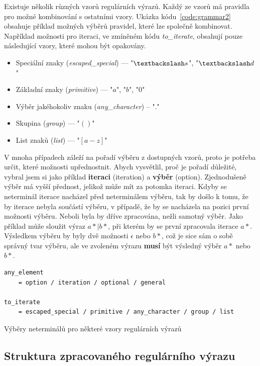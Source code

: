 Existuje několik různých vzorů regulárních výrazů.
Každý ze vzorů má pravidla pro možné kombinování s ostatními vzory.
Ukázka kódu~\ref{code:grammar2} obsahuje příklad možných výběrů pravidel, které lze společně kombinovat.
Například možnosti pro iteraci, ve zmíněném kódu \textit{to\_iterate}, obsahují pouze následující vzory, které mohou být opakovány.

\begin{itemize}
	\item Speciální znaky (\textit{escaped\_special}) --- "$\textbackslash s$", "$\textbackslash d$"
	\item Základní znaky (\textit{primitive}) --- "$a$", "$b$", "$0$"
	\item Výběr jakéhokoliv znaku (\textit{any\_character}) -- "$.$"
	\item Skupina (\textit{group}) --- "$()$"
	\item List znaků (\textit{list}) --- "$[a-z]$"
\end{itemize}

V mnoha případech záleží na pořadí výběru z dostupných vzorů, proto je potřeba určit, které možnosti upřednostnit.
Abych vysvětlil, proč je pořadí důležité, vybral jsem si jako příklad \textbf{iteraci} (iteration) a \textbf{výběr} (option).
Zjednodušeně výběr má vyšší přednost, jelikož může mít za potomka iteraci.
Kdyby se neterminál iterace nacházel před neterminálem výběru, tak by došlo k tomu, že by iterace nebyla součástí výběru, v případě, že by se nacházela na pozici první možnosti výběru. 
Neboli byla by dříve zpracována, nežli samotný výběr.
Jako příklad může sloužit výraz $a*|b*$, při kterém by se první zpracovala iterace $a*$.
Výsledkem výběru by byly dvě možnosti $\epsilon$ nebo $b*$, což je sice sám o sobě správný tvar výběru, ale ve zvoleném výrazu \textbf{musí} být výsledný výběr $a*$ nebo $b*$.

\begin{code}[!ht]
	\begin{verbatim}
any_element 
	= option / iteration / optional / general

to_iterate
	= escaped_special / primitive / any_character / group / list
	\end{verbatim}
	\caption{Výběry neterminálů pro některé vzory regulárních výrazů}
	\label{code:grammar2}
\end{code}

\subsection*{Struktura zpracovaného regulárního výrazu}

